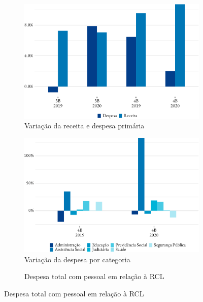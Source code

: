 \begin{figure}[!h]
	\begin{subfigure}{\linewidth}
		\caption{\label{fig:var_receita_despesa_primaria}Variação da receita e despesa primária}
		\includegraphics{fig/var_receita_despesa_primaria-1.pdf}
		\notes{\bimestres[3-4]}
	\end{subfigure}
	\begin{subfigure}{\linewidth}
		\caption{\label{fig:var_despesa_categoria}Variação da despesa por categoria}
		\includegraphics{fig/var_despesa_categoria-1.pdf}
		\notes{\bimestres[4]}
	\end{subfigure}
	\begin{subfigure}{\linewidth}
		\caption{\label{fig:desp_pessoal_rcl}Despesa total com pessoal em relação à RCL}

\end{subfigure}
\end{figure}
